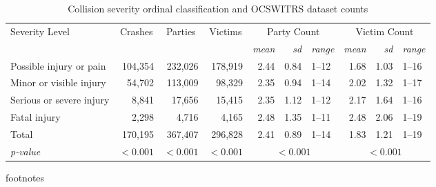 \begin{table}[h]
\centering
\caption{Collision severity ordinal classification and OCSWITRS dataset counts} 
\label{Tbl1}
\begin{tabular}{lrrrrrlrrl}
  \toprule
  \multirow{2}{*}{Severity Level} & \multicolumn{1}{c}{\multirow{2}{*}{Crashes}} & \multicolumn{1}{c}{\multirow{2}{*}{Parties}} & \multicolumn{1}{c}{\multirow{2}{*}{Victims}} & \multicolumn{3}{c}{Party Count\footnotemark[1]} & \multicolumn{3}{c}{Victim Count\footnotemark[1]} \\ 
 \cmidrule{5-7}\cmidrule{8-10} 
 & & & & \textit{mean} & \textit{sd} & \textit{range} & \textit{mean} & \textit{sd} & \textit{range} \\ 
 \midrule
Possible injury or pain & 104,354 & 232,026 & 178,919 & 2.44 & 0.84 & 1--12 & 1.68 & 1.03 & 1--16 \\ 
  Minor or visible injury & 54,702 & 113,009 & 98,329 & 2.35 & 0.94 & 1--14 & 2.02 & 1.32 & 1--17 \\ 
  Serious or severe injury & 8,841 & 17,656 & 15,415 & 2.35 & 1.12 & 1--12 & 2.17 & 1.64 & 1--16 \\ 
  Fatal injury & 2,298 & 4,716 & 4,165 & 2.48 & 1.35 & 1--11 & 2.48 & 2.06 & 1--19 \\ 
   \midrule 
Total & 170,195 & 367,407 & 296,828 & 2.41 & 0.89 & 1--14 & 1.83 & 1.21 & 1--19 \\ 
   \textit{p-value} & $<0.001$\footnotemark[2] & $<0.001$\footnotemark[2] & $<0.001$\footnotemark[2] & \multicolumn{3}{c}{$<0.001$\footnotemark[3]} & \multicolumn{3}{c}{$<0.001$\footnotemark[3]} \\ 
 \bottomrule
\end{tabular}
\end{table}
footnotes \\ 
  \midrule
{} \\ 
   \\ 
   \\ 
   \bottomrule

